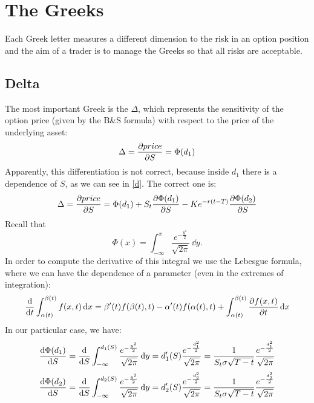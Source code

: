 \section{The Greeks}
Each Greek letter measures a different dimension to the risk in an option position and the aim of a trader is to manage the Greeks so that all risks are acceptable.

\subsection{Delta}
The most important Greek is the $\Delta$, which represents the sensitivity of the option price (given by the B\&S formula) with respect to the price of the underlying asset:
\begin{equation}
    \Delta = \pdv{price}{S} = \Phi(d_1)
\end{equation}
Apparently, this differentiation is not correct, because inside $d_1$ there is a dependence of $S$, as we can see in \eqref{d}. The correct one is:
\begin{equation}
    \Delta = \pdv{price}{S} = \Phi(d_1) + S_t\pdv{\Phi(d_1)}{S} - Ke^{-r(t-T)}\pdv{\Phi(d_2)}{S}
\end{equation}
Recall that 
\begin{equation*}
    \Phi(x) = \int_{-\infty}^x\dfrac{e^{-\frac{y^2}{2}}}{\sqrt{2\pi}}\,\dd y.
\end{equation*}
In order to compute the derivative of this integral we use the Lebesgue formula, where we can have the dependence of a parameter (even in the extremes of integration):
\begin{equation}
    \dv{t} \int_{\alpha(t)}^{\beta(t)}f(x,t)\,\dd x = \beta'(t)f(\beta(t),t)-\alpha'(t)f(\alpha(t),t) + \int_{\alpha(t)}^{\beta(t)}\pdv{f(x,t)}{t}\,\dd x
\end{equation}
In our particular case, we have:
\begin{align}
    \dv{\Phi(d_1)}{S} = \dv{S}\int_{-\infty}^{d_1(S)}\dfrac{e^{-\frac{y^2}{2}}}{\sqrt{2\pi}}\,\dd y 
    = d_1'(S)\dfrac{e^{-\frac{d_1^2}{2}}}{\sqrt{2\pi}}
    = \dfrac{1}{S_t\sigma\sqrt{T-t}}\dfrac{e^{-\frac{d_1^2}{2}}}{\sqrt{2\pi}}
\end{align}
\begin{align}
    \dv{\Phi(d_2)}{S} = \dv{S}\int_{-\infty}^{d_2(S)}\dfrac{e^{-\frac{y^2}{2}}}{\sqrt{2\pi}}\,\dd y 
    = d_2'(S)\dfrac{e^{-\frac{d_2^2}{2}}}{\sqrt{2\pi}}
    = \dfrac{1}{S_t\sigma\sqrt{T-t}}\dfrac{e^{-\frac{d_2^2}{2}}}{\sqrt{2\pi}}
\end{align}

